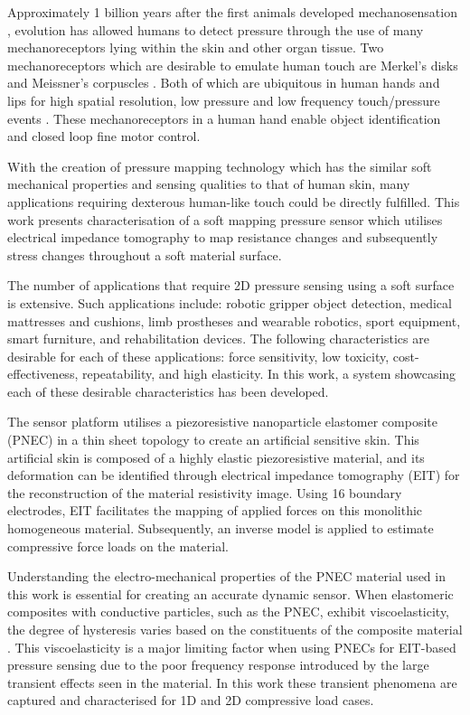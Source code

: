 Approximately 1 billion years after the first animals developed mechanosensation \citep{Parfrey2011}, evolution has allowed humans to detect pressure through the use of many mechanoreceptors lying within the skin and other organ tissue. Two mechanoreceptors which are desirable to emulate human touch are Merkel's disks and Meissner's corpuscles \citep{Kamkim2008}. Both of which are ubiquitous in human hands and lips for high spatial resolution, low pressure and low frequency touch/pressure events \citep{Molnar2015}. These mechanoreceptors in a human hand enable object identification and closed loop fine motor control. 

With the creation of pressure mapping technology which has the similar soft mechanical properties and sensing qualities to that of human skin, many applications requiring dexterous human-like touch could be directly fulfilled. This work presents characterisation of a soft mapping pressure sensor which utilises electrical impedance tomography to map resistance changes and subsequently stress changes throughout a soft material surface. 

The number of applications that require 2D pressure sensing using a soft surface is extensive. Such applications include: robotic gripper object detection, medical mattresses and cushions, limb prostheses and wearable robotics, sport equipment, smart furniture, and rehabilitation devices. The following characteristics are desirable for each of these applications: force sensitivity, low toxicity, cost-effectiveness, repeatability, and high elasticity. In this work, a system showcasing each of these desirable characteristics has been developed. 

The sensor platform utilises a piezoresistive nanoparticle elastomer composite (PNEC) in a thin sheet topology to create an artificial sensitive skin. This artificial skin is composed of a highly elastic piezoresistive material, and its deformation can be identified through electrical impedance tomography (EIT) for the reconstruction of the material resistivity image. Using 16 boundary electrodes, EIT facilitates the mapping of applied forces on this monolithic homogeneous material. Subsequently, an inverse model is applied to estimate compressive force loads on the material.

Understanding the electro-mechanical properties of the PNEC material used in this work is essential for creating an accurate dynamic sensor. When elastomeric composites with conductive particles, such as the PNEC, exhibit viscoelasticity, the degree of hysteresis varies based on the constituents of the composite material \citep{Ellingham2021}. This viscoelasticity is a major limiting factor when using PNECs for EIT-based pressure sensing due to the poor frequency response introduced by the large transient effects seen in the material. In this work these transient phenomena are captured and characterised for 1D and 2D compressive load cases.

